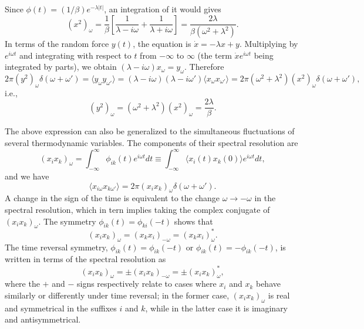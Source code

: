 \documentclass{book}
\newcommand{\average}[1]{\langle#1\rangle}
\numberwithin{equation}{section}
\begin{document}
Since $\phi(t)=(1/\beta)e^{-\lambda|t|}$, an integration of it would gives
\begin{equation}
  (x^2)_\omega=\frac{1}{\beta}\left[\frac{1}{\lambda-i\omega}+
    \frac{1}{\lambda+i\omega}\right]=\frac{2\lambda}{\beta(\omega^2+\lambda^2)}.
\end{equation}
In terms of the random force $y(t)$, the equation is $\dot{x}=-\lambda
x+y$. Multiplying by $e^{i\omega t}$ and integrating with respect to
$t$ from $-\infty$ to $\infty$ (the term $\dot{x}e^{i\omega t}$ being
integrated by parts), we obtain
$(\lambda-i\omega)x_\omega=y_\omega$. Therefore
\begin{equation}
  2\pi(y^2)_\omega\delta(\omega+\omega')=\average{y_\omega y_{\omega'}}=
  (\lambda-i\omega)(\lambda-i\omega')\average{x_\omega x_{\omega'}}=
  2\pi(\omega^2+\lambda^2)(x^2)_\omega\delta(\omega+\omega'),
\end{equation}
i.e.,
\begin{equation}
  (y^2)_\omega=(\omega^2+\lambda^2)(x^2)_\omega=\frac{2\lambda}{\beta}.
\end{equation}

The above expression can also be generalized to the simultaneous
fluctuations of several thermodynamic variables. The components of
their spectral resolution are
\begin{equation}
  (x_ix_k)_\omega=\int_{-\infty}^{\infty}\phi_{ik}(t)e^{i\omega t}dt\equiv
  \int_{-\infty}^{\infty}\average{x_i(t)x_k(0)}e^{i\omega t}dt,
\end{equation}
and we have 
\begin{equation}
  \average{x_{i\omega}x_{k\omega'}}=2\pi(x_ix_k)_\omega\delta(\omega+\omega').
\end{equation}
A change in the sign of the time is equivalent to the change
$\omega\to-\omega$ in the spectral resolution, which in tern implies
taking the complex conjugate of $(x_ix_k)_\omega$. The symmetry
$\phi_{ik}(t)=\phi_{ki}(-t)$ shows that
\begin{equation}
  (x_ix_k)_\omega=(x_kx_i)_{-\omega}=(x_kx_i)_\omega^*.
\end{equation}
The time reversal symmetry, $\phi_{ik}(t)=\phi_{ik}(-t)$ or
$\phi_{ik}(t)=-\phi_{ik}(-t)$, is written in terms of the spectral
resolution as
\begin{equation}
  (x_ix_k)_\omega=\pm(x_ix_k)_{-\omega}=\pm(x_ix_k)_\omega^*,
\end{equation}
where the $+$ and $-$ signs respectively relate to cases where $x_i$
and $x_k$ behave similarly or differently under time reversal; in the
former case, $(x_ix_k)_\omega$ is real and symmetrical in the suffixes
$i$ and $k$, while in the latter case it is imaginary and
antisymmetrical.
\end{document}
